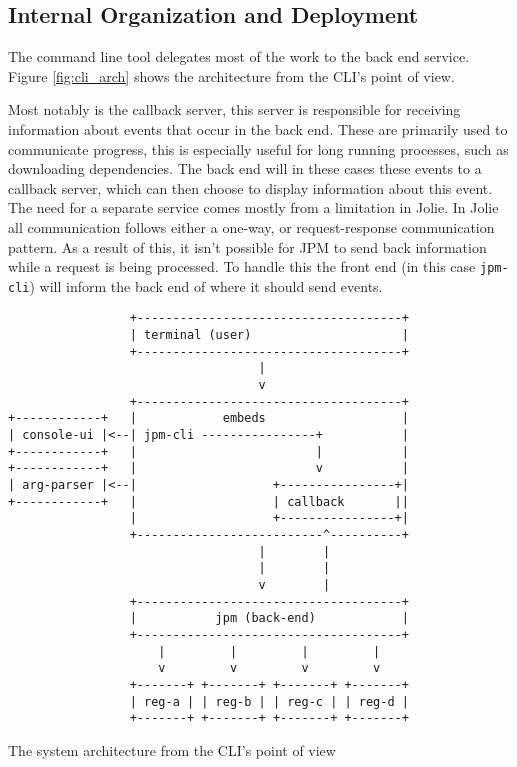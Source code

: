 \subsection{Internal Organization and Deployment}

The command line tool delegates most of the work to the back end service.
Figure \ref{fig:cli_arch} shows the architecture from the CLI's point of view.

Most notably is the callback server, this server is responsible for receiving
information about events that occur in the back end. These are primarily used
to communicate progress, this is especially useful for long running processes,
   such as downloading dependencies. The back end will in these cases these
   events to a callback server, which can then choose to display information
   about this event. The need for a separate service comes mostly from a
   limitation in Jolie. In Jolie all communication follows either a one-way, or
   request-response communication pattern. As a result of this, it isn't
   possible for JPM to send back information while a request is being
   processed. To handle this the front end (in this case
           \texttt{jpm-cli}) will inform the back end of where it
   should send events.

\begin{listing}[H]
\begin{verbatim}
                 +-------------------------------------+
                 | terminal (user)                     |
                 +-------------------------------------+
                                   |
                                   v
                 +-------------------------------------+
+------------+   |            embeds                   |
| console-ui |<--| jpm-cli ----------------+           |
+------------+   |                         |           |
+------------+   |                         v           |
| arg-parser |<--|                   +----------------+|
+------------+   |                   | callback       ||
                 |                   +----------------+|
                 +--------------------------^----------+
                                   |        |
                                   |        |
                                   v        |
                 +-------------------------------------+
                 |           jpm (back-end)            |
                 +-------------------------------------+
                     |         |         |         |
                     v         v         v         v
                 +-------+ +-------+ +-------+ +-------+
                 | reg-a | | reg-b | | reg-c | | reg-d |
                 +-------+ +-------+ +-------+ +-------+
\end{verbatim}
\caption{The system architecture from the CLI's point of view}
\label{fig:cli_arch}
\end{listing}

